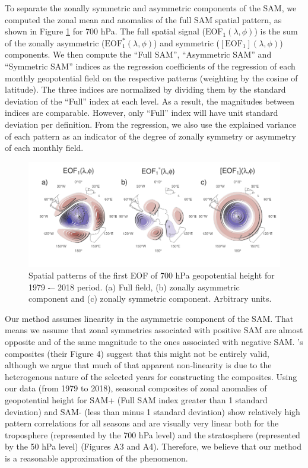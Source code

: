 \documentclass[]{ametsocV5}
\begin{document}
To separate the zonally symmetric and asymmetric components of the SAM, we computed the zonal mean and anomalies of the full SAM spatial pattern, as shown in Figure \ref{fig:method} for 700 hPa. The full spatial signal (\(\mathrm{EOF_1}(\lambda, \phi)\)) is the sum of the zonally asymmetric (\(\mathrm{EOF_1^*}(\lambda, \phi)\)) and symmetric (\([\mathrm{EOF_1}](\lambda, \phi)\)) components. We then compute the ``Full SAM'', ``Asymmetric SAM'' and ``Symmetric SAM'' indices as the regression coefficients of the regression of each monthly geopotential field on the respective patterns (weighting by the cosine of latitude). The three indices are normalized by dividing them by the standard deviation of the ``Full'' index at each level. As a result, the magnitudes between indices are comparable. However, only ``Full'' index will have unit standard deviation per definition. From the regression, we also use the explained variance of each pattern as an indicator of the degree of zonally symmetry or asymmetry of each monthly field.

\begin{figure}
\includegraphics{method-1} \caption[Spatial patterns of the first EOF of 700 hPa geopotential height for 1979 -– 2018 period]{Spatial patterns of the first EOF of 700 hPa geopotential height for 1979 -– 2018 period. (a) Full field, (b) zonally asymmetric component and (c) zonally symmetric component. Arbitrary units.}\label{fig:method}
\end{figure}

Our method assumes linearity in the asymmetric component of the SAM. That means we assume that zonal symmetries associated with positive SAM are almost opposite and of the same magnitude to the ones associated with negative SAM. \citet{fogt2012}'s composites (their Figure 4) suggest that this might not be entirely valid, although we argue that much of that apparent non-linearity is due to the heterogenous nature of the selected years for constructing the composites. Using our data (from 1979 to 2018), seasonal composites of zonal anomalies of geopotential height for SAM+ (Full SAM index greater than 1 standard deviation) and SAM- (less than minus 1 standard deviation) show relatively high pattern correlations for all seasons and are visually very linear both for the troposphere (represented by the 700 hPa level) and the stratosphere (represented by the 50 hPa level) (Figures A3 and A4). Therefore, we believe that our method is a reasonable approximation of the phenomenon.
\end{document}
